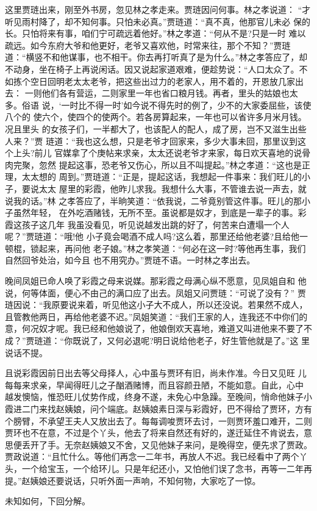 这里贾琏出来，刚至外书房，忽见林之孝走来。贾琏因问何事。林之孝说道：
“才听见雨村降了，却不知何事。只怕未必真。”贾琏道：“真不真，他那官儿未必
保的长。只怕将来有事，咱们宁可疏远着他好。”林之孝道：“何从不是?只是一时
难以疏远。如今东府大爷和他更好，老爷又喜欢他，时常来往，那个不知？”贾琏
道：“横竖不和他谋事，也不相干。你去再打听真了是为什么。”林之孝答应了，却
不动身，坐在椅子上再说闲话。因又说起家道艰难，便趁势说：“人口太众了。不
如拣个空日回明老太太老爷，把这些出过力的老家人，用不着的，开恩放几家出去：
一则他们各有营运，二则家里一年也省口粮月钱。再者，里头的姑娘也太多。俗语
说，‘一时比不得一时’如今说不得先时的例了，少不的大家委屈些，该使八个的
使六个，使四个的使两个。若各房算起来，一年也可以省许多月米月钱。况且里头
的女孩子们，一半都大了，也该配人的配人，成了房，岂不又滋生出些人来？”贾
琏道：“我也这么想，只是老爷才回家来，多少大事未回，那里议到这个上头?前儿
官媒拿了个庚帖来求亲，太太还说老爷才来家，每日欢天喜地的说骨肉完聚，忽然
提起这事，恐老爷又伤心，所以且不叫提起。”林之孝道：“这也是正理，太太想的
周到。”贾琏道：“正是，提起这话，我想起一件事来：我们旺儿的小子，要说太太
屋里的彩霞，他昨儿求我。我想什么大事，不管谁去说一声去，就说我的话。”林
之孝答应了，半晌笑道：“依我说，二爷竟别管这件事。旺儿的那小子虽然年轻，
在外吃酒赌钱，无所不至。虽说都是奴才，到底是一辈子的事。彩霞这孩子这几年
我虽没看见，听见说越发出跳的好了，何苦来白遭塌一个人呢？”贾琏道：“哦!他
小子竟会喝酒不成人吗?这么着，那里还给他老婆?且给他一顿棍，锁起来，再问他
老子娘。”林之孝笑道：“何必在这一时?等他再生事，我们自然回爷处治，如今且
也不用究办。”贾琏不语。一时林之孝出去。

晚间凤姐已命人唤了彩霞之母来说媒。那彩霞之母满心纵不愿意，见凤姐自和
他说，何等体面，便心不由己的满口应了出去。凤姐又问贾琏：“可说了没有？”
贾琏因说：“我原要说来着，听见他这小子大不成人，所以还没说。若果然不成人，
且管教他两日，再给他老婆不迟。”凤姐笑道：“我们王家的人，连我还不中你们的
意，何况奴才呢。我已经和他娘说了，他娘倒欢天喜地，难道又叫进他来不要了不
成？”贾琏道：“你既说了，又何必退呢?明日说给他老子，好生管他就是了。”这
里说话不提。

且说彩霞因前日出去等父母择人，心中虽与贾环有旧，尚未作准。今日又见旺
儿每每来求亲，早闻得旺儿之子酗酒赌博，而且容颜丑陋，不能如意。自此，心中
越发懊恼，惟恐旺儿仗势作成，终身不遂，未免心中急躁。至晚间，悄命他妹子小
霞进二门来找赵姨娘，问个端底。赵姨娘素日深与彩霞好，巴不得给了贾环，方有
个膀臂，不承望王夫人又放出去了。每每调唆贾环去讨，一则贾环羞口难开，二则
贾环也不在意，不过是个丫头，他去了将来自然还有好的，遂迁延住不肯说去，意
思便丢开了手。无奈赵姨娘又不舍，又见他妹子来问，是晚得空，便先求了贾政。
贾政说道：“且忙什么。等他们再念一二年书，再放人不迟。我已经看中了两个丫
头，一个给宝玉，一个给环儿。只是年纪还小，又怕他们误了念书，再等一二年再
提。”赵姨娘还要说话，只听外面一声响，不知何物，大家吃了一惊。

未知如何，下回分解。